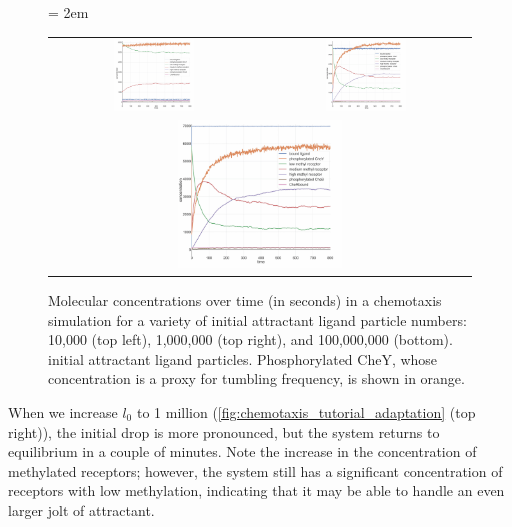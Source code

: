 \begin{figure}[h]
\centering
\mySfFamily
\tabcolsep = 2em
\begin{tabular}{c c}
\includegraphics[width = 0.4\textwidth]{../images_CMYK/chemotaxis_tutorial_oneadd1e4_vscode} & 
\includegraphics[width = 0.4\textwidth]{../images_CMYK/chemotaxis_tutorial_oneadd1e6_vscode}\\[1ex]
\multicolumn{2}{c}{\includegraphics[width = 0.4\textwidth]{../images_CMYK/chemotaxis_tutorial_oneadd1e8_vscode}}
\end{tabular}
\caption{Molecular concentrations over time (in seconds) in a chemotaxis simulation for a variety of initial attractant ligand particle numbers: 10,000 (top left), 1,000,000 (top right), and 100,000,000 (bottom). initial attractant ligand particles. Phosphorylated CheY, whose concentration is a proxy for tumbling frequency, is shown in orange.}
\label{fig:chemotaxis_tutorial_adaptation}
\end{figure}

When we increase $l_0$ to 1 million (\autoref{fig:chemotaxis_tutorial_adaptation} (top right)), the initial drop is more pronounced, but the system returns  to equilibrium in a couple of minutes. Note the increase in the  concentration of methylated receptors; however, the system still has a significant concentration of receptors with low methylation, indicating that it may be able to handle an even larger jolt of attractant.

